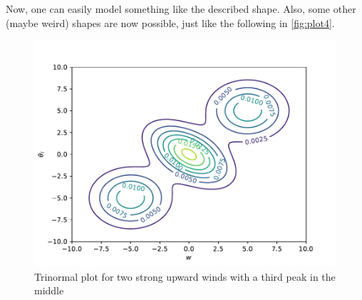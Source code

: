 Now, one can easily model something like the described shape.
Also, some other (maybe weird) shapes are now possible, just like the following in \autoref{fig:plot4}.

\begin{figure}
    \centering
    \includegraphics[width=.5\textwidth]{include/figures/plot4}
    \caption{Trinormal plot for two strong upward winds with a third peak in the middle}
    \label{fig:plot4}
\end{figure}